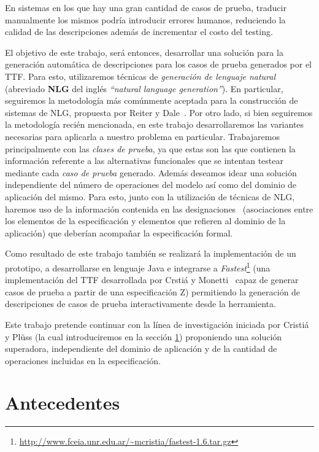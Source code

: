 En sistemas en los que hay una gran cantidad de casos de prueba, traducir manualmente los mismos podría introducir errores humanos, reduciendo la calidad de las descripciones además de incrementar el costo del testing.

El objetivo de este trabajo, será entonces, desarrollar una solución para la generación automática de descripciones para los casos de prueba generados por el TTF. Para esto, utilizaremos técnicas de \emph{generación de lenguaje natural} (abreviado \textbf{NLG} del inglés  \emph{``natural language generation''}). En particular, seguiremos la metodología más comúnmente aceptada para la construcción de sistemas de NLG, propuesta por Reiter y Dale~\cite{reiter_dale}. Por otro lado, si bien seguiremos la metodología recién mencionada, en este trabajo desarrollaremos las variantes necesarias para aplicarla a nuestro problema en particular. Trabajaremos principalmente con las \emph{clases de prueba}, ya que estas son las que contienen la información referente a las alternativas funcionales que se intentan testear mediante cada \emph{caso de prueba} generado. Además deseamos idear una solución independiente del número de operaciones del modelo así como del dominio de aplicación del mismo. Para esto, junto con la utilización de técnicas de NLG, haremos uso de la información contenida en las designaciones~\cite{jackson} (asociaciones entre los elementos de la especificación y elementos que refieren al dominio de la aplicación) que deberían acompañar la especificación formal. 

Como resultado de este trabajo también se realizará la implementación de un prototipo, a desarrollarse en lenguaje Java e integrarse a \emph{Fastest}\footnote{\url{http://www.fceia.unr.edu.ar/~mcristia/fastest-1.6.tar.gz}} (una implementación del TTF desarrollada por Crstiá y Monetti~\cite{fastest1} capaz de generar casos de prueba a partir de una especificación Z) permitiendo la generación de descripciones de casos de prueba interactivamente desde la herramienta. 

Este trabajo pretende continuar con la línea de investigación iniciada por Cristiá y Plüss \cite{cristia_pluss} (la cual introduciremos en la sección \ref{sec:antecedentes}) proponiendo una solución superadora, independiente del dominio de aplicación y de la cantidad de operaciones incluidas en la especificación.

\section{Antecedentes}
\label{sec:antecedentes}


